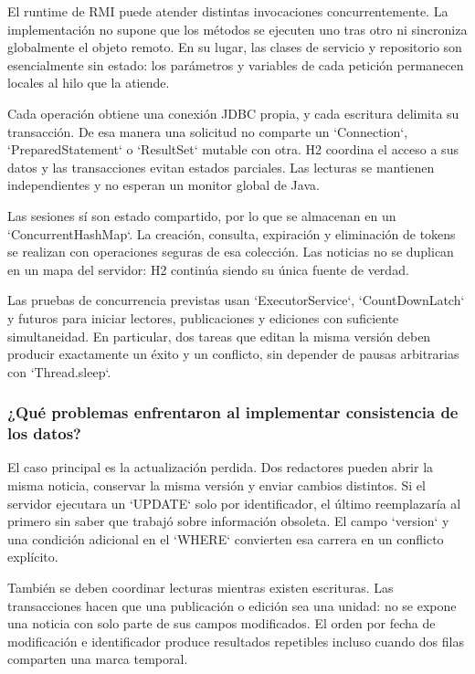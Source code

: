 El runtime de RMI puede atender distintas invocaciones concurrentemente. La implementación no supone que los métodos se ejecuten uno tras otro ni sincroniza globalmente el objeto remoto. En su lugar, las clases de servicio y repositorio son esencialmente sin estado: los parámetros y variables de cada petición permanecen locales al hilo que la atiende.

Cada operación obtiene una conexión JDBC propia, y cada escritura delimita su transacción. De esa manera una solicitud no comparte un `Connection`, `PreparedStatement` o `ResultSet` mutable con otra. H2 coordina el acceso a sus datos y las transacciones evitan estados parciales. Las lecturas se mantienen independientes y no esperan un monitor global de Java.

Las sesiones sí son estado compartido, por lo que se almacenan en un `ConcurrentHashMap`. La creación, consulta, expiración y eliminación de tokens se realizan con operaciones seguras de esa colección. Las noticias no se duplican en un mapa del servidor: H2 continúa siendo su única fuente de verdad.

Las pruebas de concurrencia previstas usan `ExecutorService`, `CountDownLatch` y futuros para iniciar lectores, publicaciones y ediciones con suficiente simultaneidad. En particular, dos tareas que editan la misma versión deben producir exactamente un éxito y un conflicto, sin depender de pausas arbitrarias con `Thread.sleep`.

\subsubsection*{¿Qué problemas enfrentaron al implementar consistencia de los datos?}

El caso principal es la actualización perdida. Dos redactores pueden abrir la misma noticia, conservar la misma versión y enviar cambios distintos. Si el servidor ejecutara un `UPDATE` solo por identificador, el último reemplazaría al primero sin saber que trabajó sobre información obsoleta. El campo `version` y una condición adicional en el `WHERE` convierten esa carrera en un conflicto explícito.

También se deben coordinar lecturas mientras existen escrituras. Las transacciones hacen que una publicación o edición sea una unidad: no se expone una noticia con solo parte de sus campos modificados. El orden por fecha de modificación e identificador produce resultados repetibles incluso cuando dos filas comparten una marca temporal.

